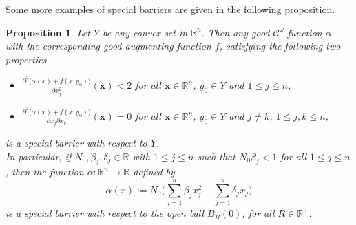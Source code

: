 \documentclass[12pt,reqno, a4paper]{amsart}
\newtheorem{proposition}[theorem]{Proposition}
\theoremstyle{definition}
\theoremstyle{definition}
\numberwithin{equation}{section}
\def\R{\mathbb{R}}                              %
\begin{document}
Some more examples of special barriers are given in the following proposition.
\begin{proposition}\label{prop_special_bar}
Let $Y$ be any convex set in $\R^n.$ Then any good $\mathcal{C}^{\omega}$ function $\alpha$ with the corresponding good augmenting function $f$, satisfying the following two properties
\begin{itemize}
	\item[(a)] $\frac{\partial^2\big(\alpha(x)+f(x,y_0)\big)}{\partial x_j^2}(\mathbf{x})<2$ for all $\mathbf{x}\in \R^n$, $y_0\in Y$ and $1\leq j\leq n$,
	\item [(b)] $\frac{\partial^2\big(\alpha(x)+f(x,y_0)\big)}{\partial x_j\partial x_k }(\mathbf{x})=0$ for all $\mathbf{x}\in \R^n$, $y_0\in Y$ and $ j\neq k$, $1\leq j,k\leq n$,
\end{itemize}
is a special barrier with respect to $Y$. \\

In particular, if $N_0,\beta_j, \delta_j\in \R$ with ${1\leq j\leq n}$ such that $N_0\beta_j<1$ for all $1\leq j\leq n$, then the function $\alpha:\R^n \to \R$ defined by
$$ \alpha(x):=N_0\big(\sum_{j=1}^{n}\beta_jx_j^2-\sum_{j=1}^{n}\delta_jx_j\big) $$ is a special barrier with respect to the open ball $B_R(0)$, for all $R\in \R^+.$
\end{proposition}
\end{document}
